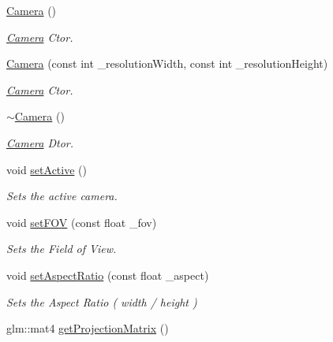 \begin{DoxyCompactItemize}
\item 
\hyperlink{class_cookie_eng_1_1_object_1_1_camera_aa98f73385bfef2dd29f3763dd6a7549c}{Camera} ()
\begin{DoxyCompactList}\small\item\em \hyperlink{class_cookie_eng_1_1_object_1_1_camera}{Camera} Ctor. \end{DoxyCompactList}\item 
\hyperlink{class_cookie_eng_1_1_object_1_1_camera_ae11d9131d0dddff4e6ab545e0b09657c}{Camera} (const int \+\_\+resolution\+Width, const int \+\_\+resolution\+Height)
\begin{DoxyCompactList}\small\item\em \hyperlink{class_cookie_eng_1_1_object_1_1_camera}{Camera} Ctor. \end{DoxyCompactList}\item 
\hyperlink{class_cookie_eng_1_1_object_1_1_camera_a8d672ca800d63af6fe3d6665471a2b05}{$\sim$\+Camera} ()
\begin{DoxyCompactList}\small\item\em \hyperlink{class_cookie_eng_1_1_object_1_1_camera}{Camera} Dtor. \end{DoxyCompactList}\item 
void \hyperlink{class_cookie_eng_1_1_object_1_1_camera_aaab2361ba6df40d0aae7952a8e474c08}{set\+Active} ()
\begin{DoxyCompactList}\small\item\em Sets the active camera. \end{DoxyCompactList}\item 
void \hyperlink{class_cookie_eng_1_1_object_1_1_camera_aef44a3e6cef1540be7e8bcb977dddd78}{set\+F\+OV} (const float \+\_\+fov)
\begin{DoxyCompactList}\small\item\em Sets the Field of View. \end{DoxyCompactList}\item 
void \hyperlink{class_cookie_eng_1_1_object_1_1_camera_a2a86235e64f591e8c812f1d69be30a94}{set\+Aspect\+Ratio} (const float \+\_\+aspect)
\begin{DoxyCompactList}\small\item\em Sets the Aspect Ratio ( width / height ) \end{DoxyCompactList}\item 
glm\+::mat4 \hyperlink{class_cookie_eng_1_1_object_1_1_camera_afa69ef269138610423e2dc8707720500}{get\+Projection\+Matrix} ()

\end{DoxyCompactItemize}
